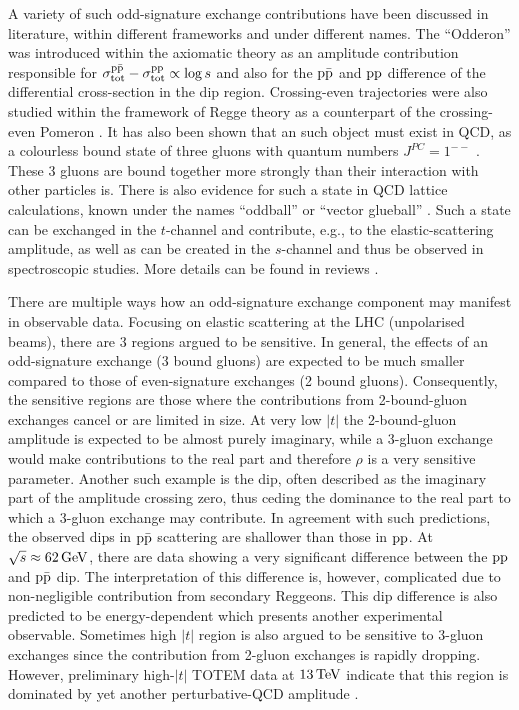 A variety of such odd-signature exchange contributions have been discussed in literature, within different frameworks and under different names. The ``Odderon'' was introduced within the axiomatic theory \cite{nicolescu-1990,nicolescu-2007} as an amplitude contribution responsible for $\sigma_{\rm tot}^{\rm p\bar p} - \sigma_{\rm tot}^{\rm pp} \propto \log s$ and also for the $\rm p\bar p$ and $\rm pp$ difference of the differential cross-section in the dip region. Crossing-even trajectories were also studied within the framework of Regge theory as a counterpart of the crossing-even Pomeron . It has also been shown that an such object must exist in QCD, as a colourless bound state of three gluons with quantum numbers $J^{PC} = 1^{--}$ . These 3 gluons are bound together more strongly than their interaction with other particles is. There is also evidence for such a state in QCD lattice calculations, known under the names ``oddball'' or ``vector glueball'' . Such a state can be exchanged in the $t$-channel and contribute, e.g., to the elastic-scattering amplitude, as well as can be created in the $s$-channel and thus be observed in spectroscopic studies. More details can be found in reviews \cite{braun,ewerz}.

There are multiple ways how an odd-signature exchange component may manifest in observable data. Focusing on elastic scattering at the LHC (unpolarised beams), there are 3 regions argued to be sensitive. In general, the effects of an odd-signature exchange (3 bound gluons) are expected to be much smaller compared to those of even-signature exchanges (2 bound gluons). Consequently, the sensitive regions are those where the contributions from 2-bound-gluon exchanges cancel or are limited in size. At very low $|t|$ the 2-bound-gluon amplitude is expected to be almost purely imaginary, while a 3-gluon exchange would make contributions to the real part and therefore $\rho$ is a very sensitive parameter. Another such example is the dip, often described as the imaginary part of the amplitude crossing zero, thus ceding the dominance to the real part to which a 3-gluon exchange may contribute. In agreement with such predictions, the observed dips in $\rm p\bar p$ scattering are shallower than those in $\rm pp$. At $\sqrt s \approx 62\,{\rm GeV}$, there are data showing a very significant difference between the $\rm pp$ and $\rm p\bar p$ dip. The interpretation of this difference is, however, complicated due to non-negligible contribution from secondary Reggeons. This dip difference is also predicted to be energy-dependent which presents another experimental observable. Sometimes high $|t|$ region is also argued to be sensitive to 3-gluon exchanges since the contribution from 2-gluon exchanges is rapidly dropping. However, preliminary high-$|t|$ TOTEM data at $13\,{\rm TeV}$ indicate that this region is dominated by yet another perturbative-QCD amplitude .

